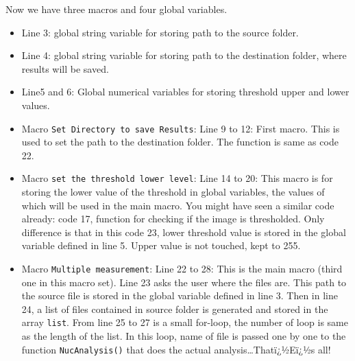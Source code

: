 \documentclass[11pt,a4paper,oneside]{report}
\newcommand{\ilcom}[1]{\texttt{\small#1}}
\begin{document}
Now we have three macros and four global variables. 
\begin{itemize}
\item Line 3: global string variable for storing path to the source folder. 
\item Line 4: global string variable for storing path to the destination folder, where results will be saved. 
\item Line5 and 6: Global numerical variables for storing threshold upper and lower values. 

\item Macro \ilcom{Set Directory to save Results}: Line 9 to 12: First macro. This is used to set the path to the destination folder. The function is same as code 22.
 
\item Macro \ilcom{set the threshold lower level}: Line 14 to 20: This macro is for storing the lower value of the threshold in global variables, the values of which will be used in the main macro. You might have seen a similar code already: code 17, function for checking if the image is thresholded. Only difference is that in this code 23, lower threshold value is stored in the global variable defined in line 5. Upper value is not touched, kept to 255. 

\item Macro \ilcom{Multiple measurement}: Line 22 to 28: This is the main macro (third one in this macro set). Line 23 asks the user where the files are. This path to the source file is stored in the global variable defined in line 3. Then in line 24, a list of files contained in source folder is generated and stored in the array \ilcom{list}. From line 25 to 27 is a small for-loop, the number of loop is same as the length of the list. In this loop, name of file is passed one by one to the function \ilcom{NucAnalysis()} that does the actual analysis\ldots Thatï¿½Eï¿½s all!


\end{itemize}
\end{document}
